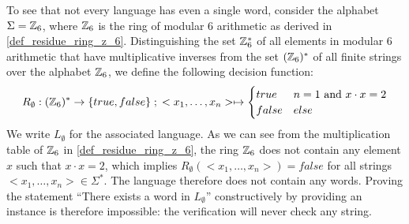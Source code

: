 \begin{example} To see that not every language has even a single word, consider the alphabet $\Sigma = \mathbb{Z}_6$, where $\mathbb{Z}_6$ is the ring of modular $6$ arithmetic as derived in \examplename{} \ref{def_residue_ring_z_6}. Distinguishing the set $\mathbb{Z}_6^*$ of all elements in modular $6$ arithmetic that have multiplicative inverses from the set $(\mathbb{Z}_6)^*$ of all finite strings over the alphabet $\mathbb{Z}_6$, we define the following decision function:
\begin{equation}
R_{\emptyset} : (\mathbb{Z}_{6})^* \to \{true, false\}\;;\;
<x_1,\ldots,x_n> \mapsto
\begin{cases}
true & n=1 \text{ and } x\cdot x = 2\\
false & else
\end{cases}
\end{equation}
We write $L_\emptyset$ for the associated language. As we can see from the multiplication table of $\mathbb{Z}_6$ in \examplename{} \ref{def_residue_ring_z_6}, the ring $\mathbb{Z}_6$ does not contain any element $x$ such that $x\cdot x =2$, which implies $R_{\emptyset}(<x_1,\ldots,x_n>)=false$ for all strings $<x_1,\ldots,x_n>\in \Sigma^*$. The language therefore does not contain any words. Proving the statement ``There exists a word in $L_\emptyset$'' constructively by providing an instance is therefore impossible: the verification will never check any string.
\end{example}
